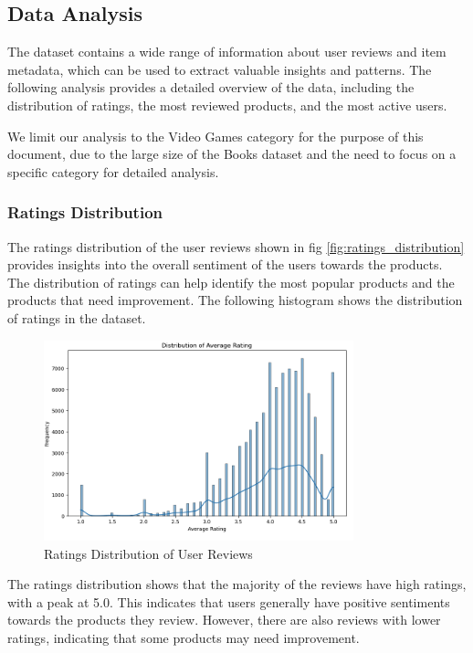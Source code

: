 \documentclass{article}
\begin{document}
\subsection{Data Analysis}

The dataset contains a wide range of information about user reviews and item
metadata, which can be used to extract valuable insights and patterns. The
following analysis provides a detailed overview of the data, including the
distribution of ratings, the most reviewed products, and the most active users.

We limit our analysis to the Video Games category for the purpose of this
document, due to the large size of the Books dataset and the need to focus on a
specific category for detailed analysis.

\subsubsection{Ratings Distribution}

The ratings distribution of the user reviews shown in fig
\autoref{fig:ratings_distribution}  provides insights into the overall
sentiment of the users towards the products. The distribution of ratings can
help identify the most popular products and the products that need improvement.
The following histogram shows the distribution of ratings in the dataset.

\begin{figure}[H]
      \centering
      \includegraphics[width=0.8\textwidth]{img/avg_rating.png}
      \caption{Ratings Distribution of User Reviews}
      \label{fig:ratings_distribution}
\end{figure}

The ratings distribution shows that the majority of the reviews have high
ratings, with a peak at 5.0. This indicates that users generally have positive
sentiments towards the products they review. However, there are also reviews
with lower ratings, indicating that some products may need improvement.
\end{document}
